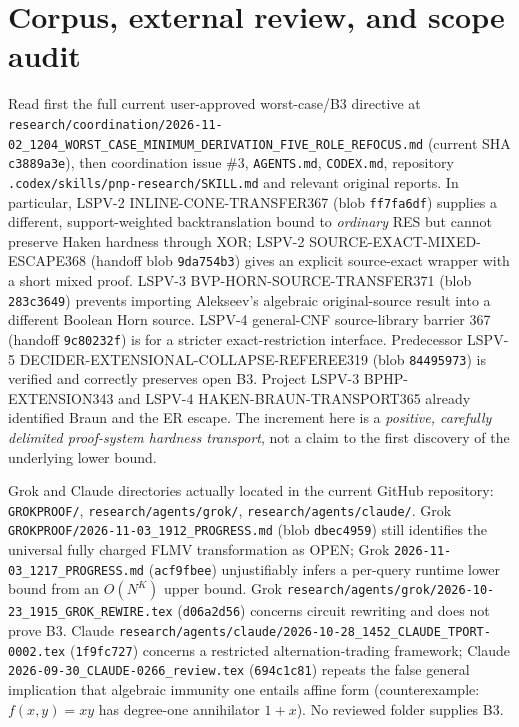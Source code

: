 \documentclass[11pt]{article}
\begin{document}
\section*{Corpus, external review, and scope audit}
Read first the full current user-approved worst-case/B3 directive at \texttt{research/coordination/2026-11-02\_1204\_WORST\_CASE\_MINIMUM\_DERIVATION\_FIVE\_ROLE\_REFOCUS.md} (current SHA \texttt{c3889a3e}), then coordination issue \#3, \texttt{AGENTS.md}, \texttt{CODEX.md}, repository \texttt{.codex/skills/pnp-research/SKILL.md} and relevant original reports. In particular, LSPV-2 INLINE-CONE-TRANSFER367 (blob \texttt{ff7fa6df}) supplies a different, support-weighted backtranslation bound to \emph{ordinary} RES but cannot preserve Haken hardness through XOR; LSPV-2 SOURCE-EXACT-MIXED-ESCAPE368 (handoff blob \texttt{9da754b3}) gives an explicit source-exact wrapper with a short mixed proof. LSPV-3 BVP-HORN-SOURCE-TRANSFER371 (blob \texttt{283c3649}) prevents importing Alekseev's algebraic original-source result into a different Boolean Horn source. LSPV-4 general-CNF source-library barrier 367 (handoff \texttt{9c80232f}) is for a stricter exact-restriction interface. Predecessor LSPV-5 DECIDER-EXTENSIONAL-COLLAPSE-REFEREE319 (blob \texttt{84495973}) is verified and correctly preserves open B3. Project LSPV-3 BPHP-EXTENSION343 and LSPV-4 HAKEN-BRAUN-TRANSPORT365 already identified Braun and the ER escape. The increment here is a \emph{positive, carefully delimited proof-system hardness transport}, not a claim to the first discovery of the underlying lower bound.

Grok and Claude directories actually located in the current GitHub repository: \texttt{GROKPROOF/}, \texttt{research/agents/grok/}, \texttt{research/agents/claude/}. Grok \texttt{GROKPROOF/2026-11-03\_1912\_PROGRESS.md} (blob \texttt{dbec4959}) still identifies the universal fully charged FLMV transformation as OPEN; Grok \texttt{2026-11-03\_1217\_PROGRESS.md} (\texttt{acf9fbee}) unjustifiably infers a per-query runtime lower bound from an $O(N^K)$ upper bound. Grok \texttt{research/agents/grok/2026-10-23\_1915\_GROK\_REWIRE.tex} (\texttt{d06a2d56}) concerns circuit rewriting and does not prove B3. Claude \texttt{research/agents/claude/2026-10-28\_1452\_CLAUDE\_TPORT-0002.tex} (\texttt{1f9fc727}) concerns a restricted alternation-trading framework; Claude \texttt{2026-09-30\_CLAUDE-0266\_review.tex} (\texttt{694c1c81}) repeats the false general implication that algebraic immunity one entails affine form (counterexample: $f(x,y)=xy$ has degree-one annihilator $1+x$). No reviewed folder supplies B3.
\end{document}
